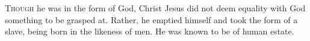 
\lettrine{T}{hough} he was in the form of God, Christ Jesus did not deem equality with God something to be grasped at. Rather, he emptied himself and took the form of a slave, being born in the likeness of men. He was known to be of human estate.

